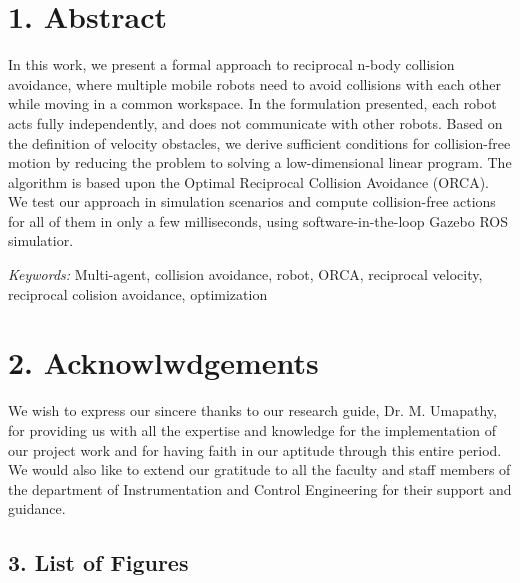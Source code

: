 \documentclass[12pt]{report}
\begin{document}
\chapter*{1.  Abstract}

In this work, we present a formal approach to reciprocal n-body collision
avoidance, where multiple mobile robots need to avoid collisions with each other
while moving in a common workspace. In the formulation presented, each robot acts fully independently, and does not communicate with other robots. Based on the definition
of velocity obstacles, we derive sufficient conditions for collision-free motion
by reducing the problem to solving a low-dimensional linear program. The algorithm is based upon the Optimal Reciprocal Collision Avoidance (ORCA). We test our approach in simulation scenarios and compute collision-free actions for all of them in only a few milliseconds, using software-in-the-loop Gazebo ROS simulatior.

\vspace{10mm}

\begin{flushleft}
\textit{Keywords: }Multi-agent, collision avoidance, robot, ORCA, reciprocal velocity, reciprocal colision avoidance, optimization
\end{flushleft}

\newpage
\chapter*{2.  Acknowlwdgements}

We wish to express our sincere thanks to our research guide, Dr. M. Umapathy, for
providing us with all the expertise and knowledge for the implementation of our
project work and for having faith in our aptitude through this entire period. We would
also like to extend our gratitude to all the faculty and staff members of the department
of Instrumentation and Control Engineering for their support and guidance.



\tableofcontents
\begin{center}
\chapter*{3.  List of Figures}
\end{center}
\end{document}
